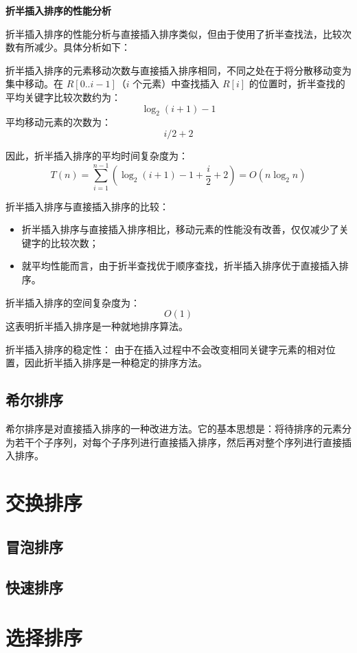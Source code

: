 \documentclass[lang=cn,newtx,10pt,scheme=chinese]{elegantbook}
\begin{document}
\textbf{折半插入排序的性能分析}

折半插入排序的性能分析与直接插入排序类似，但由于使用了折半查找法，比较次数有所减少。具体分析如下：


折半插入排序的元素移动次数与直接插入排序相同，不同之处在于将分散移动变为集中移动。在 $R[0..i-1]$（$i$ 个元素）中查找插入 $R[i]$ 的位置时，折半查找的平均关键字比较次数约为：
\[
\log_2(i+1) - 1
\]
平均移动元素的次数为：
\[
i/2 + 2
\]

因此，折半插入排序的平均时间复杂度为：
\[
T(n) = \sum_{i=1}^{n-1} \left(\log_2(i+1) - 1 + \frac{i}{2} + 2\right) = O(n \log_2 n)
\]


折半插入排序与直接插入排序的比较：
\begin{itemize}
  \item 折半插入排序与直接插入排序相比，移动元素的性能没有改善，仅仅减少了关键字的比较次数；
  \item 就平均性能而言，由于折半查找优于顺序查找，折半插入排序优于直接插入排序。
\end{itemize}


折半插入排序的空间复杂度为：
\[
O(1)
\]
这表明折半插入排序是一种就地排序算法。

折半插入排序的稳定性：  
由于在插入过程中不会改变相同关键字元素的相对位置，因此折半插入排序是一种稳定的排序方法。

\subsection{希尔排序}

希尔排序是对直接插入排序的一种改进方法。它的基本思想是：将待排序的元素分为若干个子序列，对每个子序列进行直接插入排序，然后再对整个序列进行直接插入排序。 
\section{交换排序}

\subsection{冒泡排序}

\subsection{快速排序}

\section{选择排序}
\end{document}

